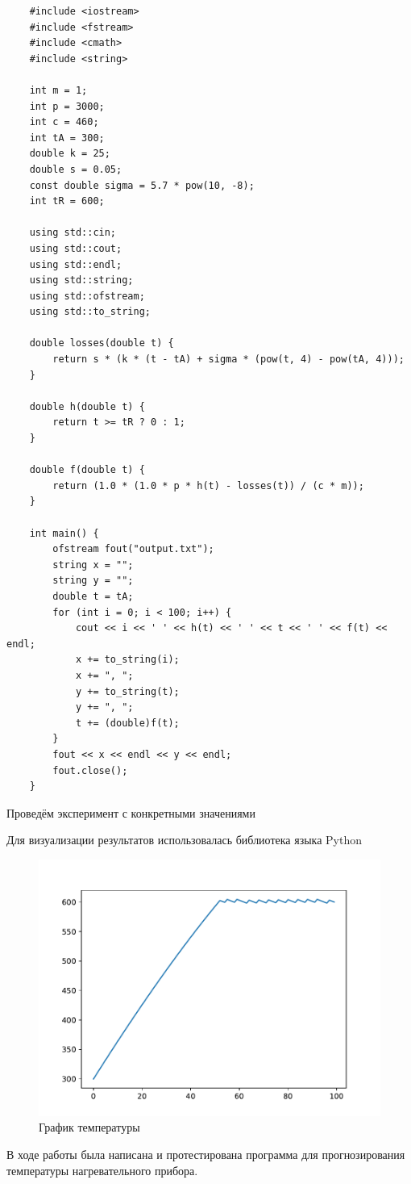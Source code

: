 \documentclass[a4paper, 14pt, titlepage, fleqn]{extarticle}
\begin{document}
    \begin{lstlisting}
    #include <iostream>
    #include <fstream>
    #include <cmath>
    #include <string>
    
    int m = 1;
    int p = 3000;
    int c = 460;
    int tA = 300;
    double k = 25;
    double s = 0.05;
    const double sigma = 5.7 * pow(10, -8);
    int tR = 600;
    
    using std::cin;
    using std::cout;
    using std::endl;
    using std::string;
    using std::ofstream;
    using std::to_string;
    
    double losses(double t) {
        return s * (k * (t - tA) + sigma * (pow(t, 4) - pow(tA, 4)));
    }
    
    double h(double t) {
        return t >= tR ? 0 : 1;
    }
    
    double f(double t) {
        return (1.0 * (1.0 * p * h(t) - losses(t)) / (c * m));
    }
    
    int main() {
        ofstream fout("output.txt");
        string x = "";
        string y = "";
        double t = tA;
        for (int i = 0; i < 100; i++) {
            cout << i << ' ' << h(t) << ' ' << t << ' ' << f(t) << endl;
            x += to_string(i);
            x += ", ";
            y += to_string(t);
            y += ", ";
            t += (double)f(t);
        }
        fout << x << endl << y << endl;
        fout.close();
    }

    \end{lstlisting}

            Проведём эксперимент с конкретными значениями

            Для визуализации результатов использовалась библиотека языка Python

            \begin{figure}[H]
                \centering
                \includegraphics[width = \textwidth]{assets/nag1t100.pdf}
                \caption[.] {График температуры}
            \end{figure}          

        
        В ходе работы была написана и протестирована программа для прогнозирования температуры нагревательного прибора. 
\end{document}
